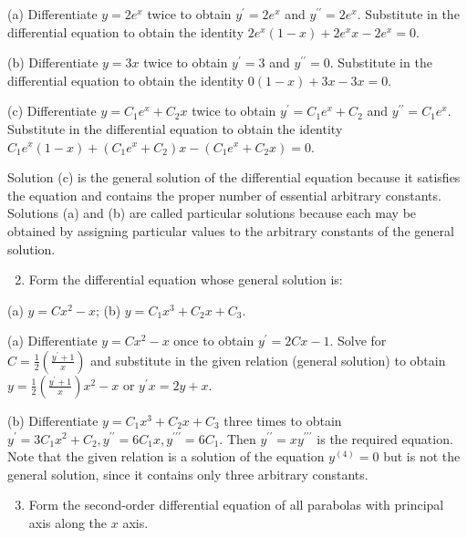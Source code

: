 \documentclass[10pt]{article}
\begin{document}
(a) Differentiate $y=2 e^{x}$ twice to obtain $y^{\prime}=2 e^{x}$ and $y^{\prime \prime}=2 e^{x}$. Substitute in the differential equation to obtain the identity $2 e^{x}(1-x)+2 e^{x} x-2 e^{x}=0$.

(b) Differentiate $y=3 x$ twice to obtain $y^{\prime}=3$ and $y^{\prime \prime}=0$. Substitute in the differential equation to obtain the identity $0(1-x)+3 x-3 x=0$.

(c) Differentiate $y=C_{1} e^{x}+C_{2} x$ twice to obtain $y^{\prime}=C_{1} e^{x}+C_{2}$ and $y^{\prime \prime}=C_{1} e^{x}$. Substitute in the differential equation to obtain the identity $C_{1} e^{x}(1-x)+\left(C_{1} e^{x}+C_{2}\right) x-\left(C_{1} e^{x}+C_{2} x\right)=0$.

Solution (c) is the general solution of the differential equation because it satisfies the equation and contains the proper number of essential arbitrary constants. Solutions (a) and (b) are called particular solutions because each may be obtained by assigning particular values to the arbitrary constants of the general solution.

\begin{enumerate}
  \setcounter{enumi}{1}
  \item Form the differential equation whose general solution is:
\end{enumerate}

(a) $y=C x^{2}-x$; (b) $y=C_{1} x^{3}+C_{2} x+C_{3}$.

(a) Differentiate $y=C x^{2}-x$ once to obtain $y^{\prime}=2 C x-1$. Solve for $C=\frac{1}{2}\left(\frac{y^{\prime}+1}{x}\right)$ and substitute in the given relation (general solution) to obtain $y=\frac{1}{2}\left(\frac{y^{\prime}+1}{x}\right) x^{2}-x$ or $y^{\prime} x=2 y+x$.

(b) Differentiate $y=C_{1} x^{3}+C_{2} x+C_{3}$ three times to obtain $y^{\prime}=3 C_{1} x^{2}+C_{2}, y^{\prime \prime}=6 C_{1} x, y^{\prime \prime \prime}=6 C_{1}$. Then $y^{\prime \prime}=x y^{\prime \prime \prime}$ is the required equation. Note that the given relation is a solution of the equation $y^{(4)}=0$ but is not the general solution, since it contains only three arbitrary constants.

\begin{enumerate}
  \setcounter{enumi}{2}
  \item Form the second-order differential equation of all parabolas with principal axis along the $x$ axis.
\end{enumerate}
\end{document}
